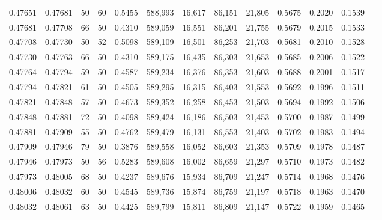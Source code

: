\begin{tabular}{rrrrrrrrrrrrr}
0.47651 & 0.47681 &    50 &  60 &                                     0.5455 & 588,993 &  16,617 &  86,151 &  21,805 & 0.5675 & 0.2020 & 0.1539 \\
0.47681 & 0.47708 &    66 &  50 &                                     0.4310 & 589,059 &  16,551 &  86,201 &  21,755 & 0.5679 & 0.2015 & 0.1533 \\
0.47708 & 0.47730 &    50 &  52 &                                     0.5098 & 589,109 &  16,501 &  86,253 &  21,703 & 0.5681 & 0.2010 & 0.1528 \\
0.47730 & 0.47763 &    66 &  50 &                                     0.4310 & 589,175 &  16,435 &  86,303 &  21,653 & 0.5685 & 0.2006 & 0.1522 \\
0.47764 & 0.47794 &    59 &  50 &                                     0.4587 & 589,234 &  16,376 &  86,353 &  21,603 & 0.5688 & 0.2001 & 0.1517 \\
0.47794 & 0.47821 &    61 &  50 &                                     0.4505 & 589,295 &  16,315 &  86,403 &  21,553 & 0.5692 & 0.1996 & 0.1511 \\
0.47821 & 0.47848 &    57 &  50 &                                     0.4673 & 589,352 &  16,258 &  86,453 &  21,503 & 0.5694 & 0.1992 & 0.1506 \\
0.47848 & 0.47881 &    72 &  50 &                                     0.4098 & 589,424 &  16,186 &  86,503 &  21,453 & 0.5700 & 0.1987 & 0.1499 \\
0.47881 & 0.47909 &    55 &  50 &                                     0.4762 & 589,479 &  16,131 &  86,553 &  21,403 & 0.5702 & 0.1983 & 0.1494 \\
0.47909 & 0.47946 &    79 &  50 &                                     0.3876 & 589,558 &  16,052 &  86,603 &  21,353 & 0.5709 & 0.1978 & 0.1487 \\
0.47946 & 0.47973 &    50 &  56 &                                     0.5283 & 589,608 &  16,002 &  86,659 &  21,297 & 0.5710 & 0.1973 & 0.1482 \\
0.47973 & 0.48005 &    68 &  50 &                                     0.4237 & 589,676 &  15,934 &  86,709 &  21,247 & 0.5714 & 0.1968 & 0.1476 \\
0.48006 & 0.48032 &    60 &  50 &                                     0.4545 & 589,736 &  15,874 &  86,759 &  21,197 & 0.5718 & 0.1963 & 0.1470 \\
0.48032 & 0.48061 &    63 &  50 &                                     0.4425 & 589,799 &  15,811 &  86,809 &  21,147 & 0.5722 & 0.1959 & 0.1465 \\

\end{tabular}
